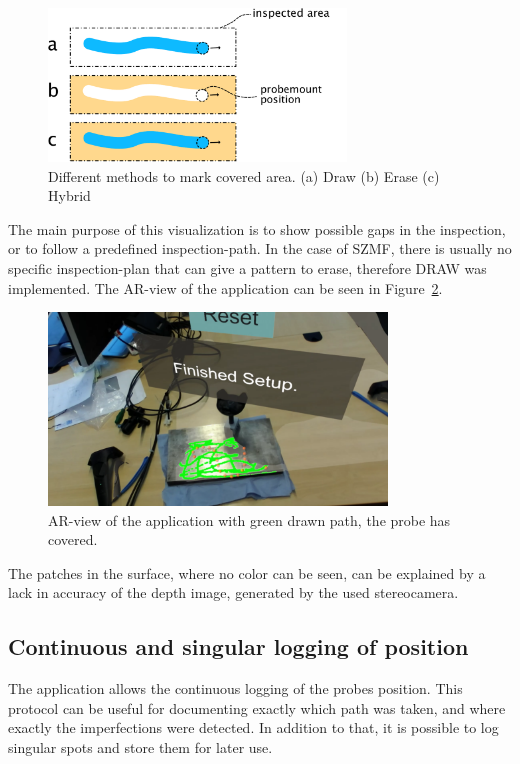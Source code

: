 \documentclass{VRARWorkshop}
\begin{document}
\begin{figure}[h!]
    \begin{center}
        \includegraphics[width=79mm]{images/DrawVsErase}
        \caption{\label{fig:DrawVsErase} Different methods to mark covered area. (a) {\sc Draw} (b) {\sc Erase} (c) {\sc Hybrid}}
    \end{center}
\end{figure}

The main purpose of this visualization is to show possible gaps in the inspection, or to follow a predefined inspection-path.
In the case of SZMF, there is usually no specific inspection-plan that can give a pattern to erase, therefore {\sc DRAW} was implemented.
The AR-view of the application can be seen in Figure~\ref{fig:ARView}.

\begin{figure}[h!]
    \begin{center}
        \includegraphics[width=90mm]{images/AR-Screenshot}
        \caption{\label{fig:ARView} AR-view of the application with green drawn path, the probe has covered.}
    \end{center}
\end{figure}

The patches in the surface, where no color can be seen, can be explained by a lack in accuracy of the depth image, generated by the used stereocamera.

\subsection{Continuous and singular logging of position}
The application allows the continuous logging of the probes position.
This protocol can be useful for documenting exactly which path was taken, and where exactly the imperfections were detected.
In addition to that, it is possible to log singular spots and store them for later use.
\end{document}
